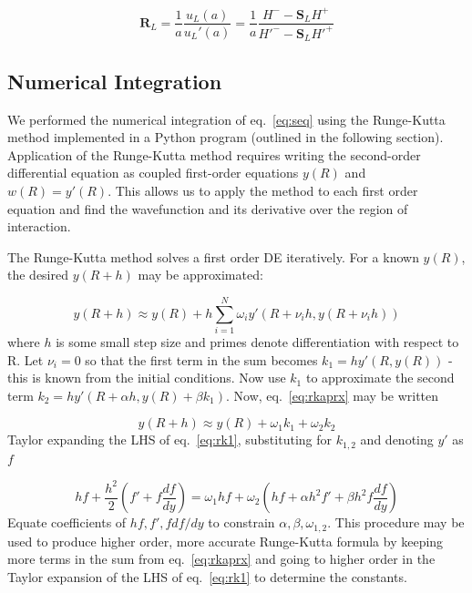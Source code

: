\documentclass[]{scrartcl}
\begin{document}
\begin{equation}
	\mathbf{R}_L = \frac{1}{a} \frac{u _L (a)}{u _L ' (a)} = \frac{1}{a} \frac{H^- - \mathbf{S}_L H^+}{H'^- - \mathbf{S}_L H' ^+}
	\label{eq:rmtx}
\end{equation}

\subsection*{Numerical Integration}

We performed the numerical integration of eq.~\ref{eq:seq} using the Runge-Kutta method implemented in a Python program (outlined in the following section). Application of the Runge-Kutta method requires writing the second-order differential equation as coupled first-order equations $y(R)$ and $w(R) = y'(R)$. This allows us to apply the method to each first order equation and find the wavefunction and its derivative over the region of interaction.

The Runge-Kutta method solves a first order DE iteratively. For a known $y(R)$, the desired $y(R+h)$ may be approximated:

\begin{equation}
	y(R+h) \approx y(R) + h \sum_{i=1}^N \omega_i y'(R + \nu_i h,y(R + \nu_ih))
	\label{eq:rkaprx}
\end{equation}
where $h$ is some small step size and primes denote differentiation with respect to R. Let $\nu_i =0$ so that the first term in the sum becomes $k_1 = h y' (R,y(R))$ - this is known from the initial conditions. Now use $k_1$ to approximate the second term $k_2 = h y' (R+\alpha h, y(R) + \beta k_1)$. Now, eq.~\ref{eq:rkaprx} may be written

\begin{equation}
	y(R+h) \approx y(R) + \omega_1 k_1 + \omega_2 k_2
	\label{eq:rk1}
\end{equation}
Taylor expanding the LHS of eq.~\ref{eq:rk1}, substituting for $k_{1,2}$ and denoting $y'$ as $f$

\begin{equation}
	hf + \frac{h^2}{2} \left ( f' + f \frac{df}{dy} \right ) = \omega_1 hf + \omega_2 \left  ( hf + \alpha h^2 f' + \beta h^2 f \frac{df}{dy} \right )
	\label{eq:rk2}
\end{equation}
Equate coefficients of $hf,f',f df/dy$ to constrain $\alpha, \beta, \omega_{1,2}$. This procedure may be used to produce higher order, more accurate Runge-Kutta formula by keeping more terms in the sum from eq.~\ref{eq:rkaprx} and going to higher order in the Taylor expansion of the LHS of eq.~\ref{eq:rk1} to determine the constants.
\end{document}
